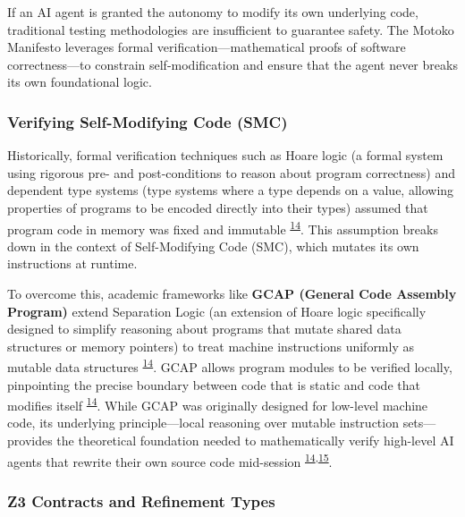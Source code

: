 \documentclass[
  11pt,
]{article}
\begin{document}
If an AI agent is granted the autonomy to modify its own underlying
code, traditional testing methodologies are insufficient to guarantee
safety. The Motoko Manifesto leverages formal
verification---mathematical proofs of software correctness---to
constrain self-modification and ensure that the agent never breaks its
own foundational logic.

\hypertarget{verifying-self-modifying-code-smc}{%
\subsubsection{Verifying Self-Modifying Code
(SMC)}\label{verifying-self-modifying-code-smc}}

Historically, formal verification techniques such as Hoare logic (a
formal system using rigorous pre- and post-conditions to reason about
program correctness) and dependent type systems (type systems where a
type depends on a value, allowing properties of programs to be encoded
directly into their types) assumed that program code in memory was fixed
and immutable \textsuperscript{\protect\hyperlink{cite-14}{14}}. This
assumption breaks down in the context of Self-Modifying Code (SMC),
which mutates its own instructions at runtime.

To overcome this, academic frameworks like \textbf{GCAP (General Code
Assembly Program)} extend Separation Logic (an extension of Hoare logic
specifically designed to simplify reasoning about programs that mutate
shared data structures or memory pointers) to treat machine instructions
uniformly as mutable data structures
\textsuperscript{\protect\hyperlink{cite-14}{14}}. GCAP allows program
modules to be verified locally, pinpointing the precise boundary between
code that is static and code that modifies itself
\textsuperscript{\protect\hyperlink{cite-14}{14}}. While GCAP was
originally designed for low-level machine code, its underlying
principle---local reasoning over mutable instruction sets---provides the
theoretical foundation needed to mathematically verify high-level AI
agents that rewrite their own source code mid-session
\textsuperscript{\protect\hyperlink{cite-14}{14},\protect\hyperlink{cite-15}{15}}.

\hypertarget{z3-contracts-and-refinement-types}{%
\subsubsection{Z3 Contracts and Refinement
Types}\label{z3-contracts-and-refinement-types}}
\end{document}
